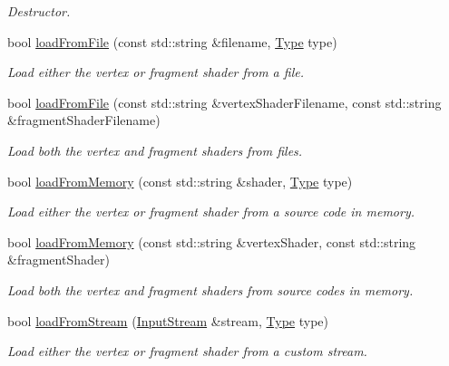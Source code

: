 \begin{DoxyCompactItemize}
\begin{DoxyCompactList}\small\item\em Destructor. \end{DoxyCompactList}\item 
bool \hyperlink{classsf_1_1Shader_a053a5632848ebaca2fcd8ba29abe9e6e}{load\-From\-File} (const std\-::string \&filename, \hyperlink{classsf_1_1Shader_afaa1aa65e5de37b74d047da9def9f9b3}{Type} type)
\begin{DoxyCompactList}\small\item\em Load either the vertex or fragment shader from a file. \end{DoxyCompactList}\item 
bool \hyperlink{classsf_1_1Shader_ac9d7289966fcef562eeb92271c03e3dc}{load\-From\-File} (const std\-::string \&vertex\-Shader\-Filename, const std\-::string \&fragment\-Shader\-Filename)
\begin{DoxyCompactList}\small\item\em Load both the vertex and fragment shaders from files. \end{DoxyCompactList}\item 
bool \hyperlink{classsf_1_1Shader_ac92d46bf71dff2d791117e4e472148aa}{load\-From\-Memory} (const std\-::string \&shader, \hyperlink{classsf_1_1Shader_afaa1aa65e5de37b74d047da9def9f9b3}{Type} type)
\begin{DoxyCompactList}\small\item\em Load either the vertex or fragment shader from a source code in memory. \end{DoxyCompactList}\item 
bool \hyperlink{classsf_1_1Shader_ae34e94070d7547a890166b7993658a9b}{load\-From\-Memory} (const std\-::string \&vertex\-Shader, const std\-::string \&fragment\-Shader)
\begin{DoxyCompactList}\small\item\em Load both the vertex and fragment shaders from source codes in memory. \end{DoxyCompactList}\item 
bool \hyperlink{classsf_1_1Shader_a2ee1b130c0606e4f8bcdf65c1efc2a53}{load\-From\-Stream} (\hyperlink{classsf_1_1InputStream}{Input\-Stream} \&stream, \hyperlink{classsf_1_1Shader_afaa1aa65e5de37b74d047da9def9f9b3}{Type} type)
\begin{DoxyCompactList}\small\item\em Load either the vertex or fragment shader from a custom stream. \end{DoxyCompactList}\item 

\end{DoxyCompactItemize}
